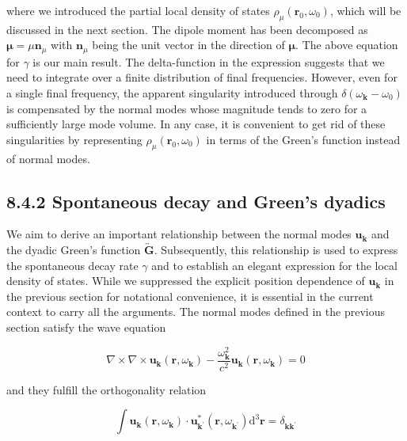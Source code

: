 \documentclass[10pt]{article}
\begin{document}
where we introduced the partial local density of states $\rho_{\mu}\left(\mathbf{r}_{0}, \omega_{0}\right)$, which will be discussed in the next section. The dipole moment has been decomposed as $\boldsymbol{\mu}=\mu \mathbf{n}_{\mu}$ with $\mathbf{n}_{\mu}$ being the unit vector in the direction of $\boldsymbol{\mu}$. The above equation for $\gamma$ is our main result. The delta-function in the expression suggests that we need to integrate over a finite distribution of final frequencies. However, even for a single final frequency, the apparent singularity introduced through $\delta\left(\omega_{\mathbf{k}}-\omega_{0}\right)$ is compensated by the normal modes whose magnitude tends to zero for a sufficiently large mode volume. In any case, it is convenient to get rid of these singularities by representing $\rho_{\mu}\left(\mathbf{r}_{0}, \omega_{0}\right)$ in terms of the Green's function instead of normal modes.

\subsection*{8.4.2 Spontaneous decay and Green's dyadics}
We aim to derive an important relationship between the normal modes $\mathbf{u}_{\mathbf{k}}$ and the dyadic Green's function $\overleftrightarrow{\mathbf{G}}$. Subsequently, this relationship is used to express the spontaneous decay rate $\gamma$ and to establish an elegant expression for the local density of states. While we suppressed the explicit position dependence of $\mathbf{u}_{\mathbf{k}}$ in the previous section for notational convenience, it is essential in the current context to carry all the arguments. The normal modes defined in the previous section satisfy the wave equation


\begin{equation*}
\nabla \times \nabla \times \mathbf{u}_{\mathbf{k}}\left(\mathbf{r}, \omega_{\mathbf{k}}\right)-\frac{\omega_{\mathbf{k}}^{2}}{c^{2}} \mathbf{u}_{\mathbf{k}}\left(\mathbf{r}, \omega_{\mathbf{k}}\right)=0 \tag{8.104}
\end{equation*}


and they fulfill the orthogonality relation


\begin{equation*}
\int \mathbf{u}_{\mathbf{k}}\left(\mathbf{r}, \omega_{\mathbf{k}}\right) \cdot \mathbf{u}_{\mathbf{k}^{\prime}}^{*}\left(\mathbf{r}, \omega_{\mathbf{k}^{\prime}}\right) \mathrm{d}^{3} \mathbf{r}=\delta_{\mathbf{k k}^{\prime}} \tag{8.105}
\end{equation*}
\end{document}
